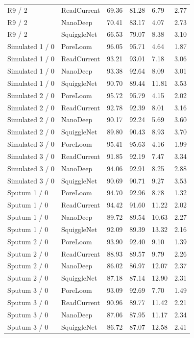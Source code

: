 \begin{longtable}{llllll}
R9 / 2 & ReadCurrent & 69.36 & 81.28 & 6.79 & 2.77\\
R9 / 2 & NanoDeep & 70.41 & 83.17 & 4.07 & 2.73\\
R9 / 2 & SquiggleNet & 66.53 & 79.07 & 8.38 & 3.10\\
Simulated 1 / 0 & PoreLoom & 96.05 & 95.71 & 4.64 & 1.87\\
Simulated 1 / 0 & ReadCurrent & 93.21 & 93.01 & 7.18 & 3.06\\
Simulated 1 / 0 & NanoDeep & 93.38 & 92.64 & 8.09 & 3.01\\
Simulated 1 / 0 & SquiggleNet & 90.70 & 89.44 & 11.81 & 3.53\\
Simulated 2 / 0 & PoreLoom & 95.72 & 95.79 & 4.15 & 2.02\\
Simulated 2 / 0 & ReadCurrent & 92.78 & 92.39 & 8.01 & 3.16\\
Simulated 2 / 0 & NanoDeep & 90.17 & 92.24 & 5.69 & 3.60\\
Simulated 2 / 0 & SquiggleNet & 89.80 & 90.43 & 8.93 & 3.70\\
Simulated 3 / 0 & PoreLoom & 95.41 & 95.63 & 4.16 & 1.99\\
Simulated 3 / 0 & ReadCurrent & 91.85 & 92.19 & 7.47 & 3.34\\
Simulated 3 / 0 & NanoDeep & 94.06 & 92.91 & 8.25 & 2.88\\
Simulated 3 / 0 & SquiggleNet & 90.69 & 90.71 & 9.27 & 3.53\\
Sputum 1 / 0 & PoreLoom & 94.70 & 92.96 & 8.78 & 1.32\\
Sputum 1 / 0 & ReadCurrent & 94.42 & 91.60 & 11.22 & 2.02\\
Sputum 1 / 0 & NanoDeep & 89.72 & 89.54 & 10.63 & 2.27\\
Sputum 1 / 0 & SquiggleNet & 92.09 & 89.39 & 13.32 & 2.16\\
Sputum 2 / 0 & PoreLoom & 93.90 & 92.40 & 9.10 & 1.39\\
Sputum 2 / 0 & ReadCurrent & 88.93 & 89.57 & 9.79 & 2.26\\
Sputum 2 / 0 & NanoDeep & 86.02 & 86.97 & 12.07 & 2.37\\
Sputum 2 / 0 & SquiggleNet & 87.18 & 87.14 & 12.90 & 2.31\\
Sputum 3 / 0 & PoreLoom & 93.09 & 92.69 & 7.70 & 1.49\\
Sputum 3 / 0 & ReadCurrent & 90.96 & 89.77 & 11.42 & 2.21\\
Sputum 3 / 0 & NanoDeep & 87.06 & 87.95 & 11.17 & 2.34\\
Sputum 3 / 0 & SquiggleNet & 86.72 & 87.07 & 12.58 & 2.41\\
\end{longtable}
